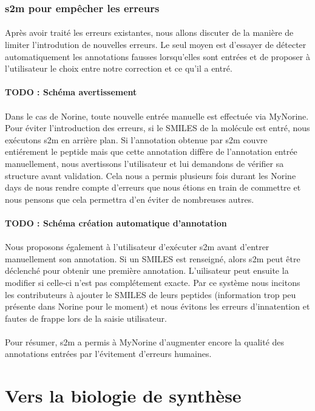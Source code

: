\documentclass[12pt,french,twoside]{report}
\begin{document}
\subsubsection{s2m pour empêcher les erreurs}

\paragraph{}Après avoir traité les erreurs existantes, nous allons discuter de la manière de limiter l'introdution de nouvelles erreurs.
Le seul moyen est d'essayer de détecter automatiquement les annotations fausses lorsqu'elles sont entrées et de proposer à l'utilisateur le choix entre notre correction et ce qu'il a entré.

\paragraph{TODO : Schéma avertissement}

\paragraph{}Dans le cas de Norine, toute nouvelle entrée manuelle est effectuée via MyNorine.
Pour éviter l'introduction des erreurs, si le SMILES de la molécule est entré, nous exécutons s2m en arrière plan.
Si l'annotation obtenue par s2m couvre entiérement le peptide mais que cette annotation diffère de l'annotation entrée manuellement, nous avertissons l'utilisateur et lui demandons de vérifier sa structure avant validation.
Cela nous a permis plusieurs fois durant les Norine days de nous rendre compte d'erreurs que nous étions en train de commettre et nous pensons que cela permettra d'en éviter de nombreuses autres.

\paragraph{TODO : Schéma création automatique d'annotation}

\paragraph{}Nous proposons également à l'utilisateur d'exécuter s2m avant d'entrer manuellement son annotation.
Si un SMILES est renseigné, alors s2m peut être déclenché pour obtenir une première annotation.
L'uilisateur peut ensuite la modifier si celle-ci n'est pas complétement exacte.
Par ce système nous incitons les contributeurs à ajouter le SMILES de leurs peptides (information trop peu présente dans Norine pour le moment) et nous évitons les erreurs d'innatention et fautes de frappe lors de la saisie utilisateur.

\paragraph{}Pour résumer, s2m a permis à MyNorine d'augmenter encore la qualité des annotations entrées par l'évitement d'erreurs humaines.







\section{Vers la biologie de synthèse}



\end{document}
